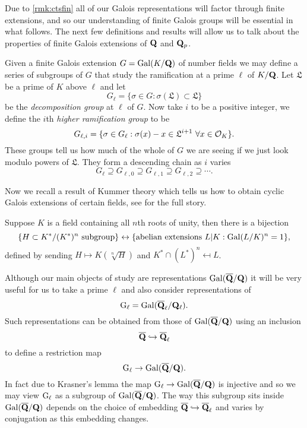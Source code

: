 \documentclass[a4paper,12pt]{article}
\begin{document}
Due to \cref{rmk:ctsfin} all of our Galois representations will factor through finite extensions, and so our understanding of finite Galois groups will be essential in what follows.
The next few definitions and results will allow us to talk about the properties of finite Galois extensions of $\mathbf{Q}$ and $\mathbf{Q}_p$.

\begin{defn}\label{def:higher}
Given a finite Galois extension $G = \operatorname{Gal}(K/\mathbf{Q})$ of number fields we may define a series of subgroups of $G$ that study the ramification at a prime $\ell$ of $K/\mathbf{Q}$.
Let $\mathfrak{L}$ be a prime of $K$ above $\ell$ and let
\[
G_\ell =\{\sigma \in G : \sigma(\mathfrak{L}) \subset \mathfrak{L}\}
\]
be the \emph{decomposition group} at $\ell$ of $G$.
Now take $i$ to be a positive integer, we define the $i$th \emph{higher ramification group} to be
\[
G_{\ell,i} = \{\sigma \in G_\ell : \sigma(x) - x \in \mathfrak{L}^{i + 1}\ \forall x \in \mathcal{O}_{K} \}.
\]
These groups tell us how much of the whole of $G$ we are seeing if we just look modulo powers of $\mathfrak{L}$.
They form a descending chain as $i$ varies
\[
G_\ell\supseteq G_{\ell,0} \supseteq G_{\ell,1} \supseteq G_{\ell, 2}\supseteq\cdots.
\]
\end{defn}

Now we recall a result of Kummer theory which tells us how to obtain cyclic Galois extensions of certain fields, see \cite{Birch} for the full story.

\begin{prop}\label{prop:kummer}
Suppose $K$ is a field containing all $n$th roots of unity, then there is a bijection
\[
\{H \subset K^*/(K^*)^n\text{ subgroup}\} \leftrightarrow \{\text{abelian extensions } L| K : \operatorname{Gal}(L/K)^n = 1\},
\]
defined by sending $H\mapsto K(\sqrt[n]{H})$ and $K^* \cap (L^*)^n\mapsfrom L$.
\end{prop}

Although our main objects of study are representations $\operatorname{Gal}(\overline{\mathbf{Q}}/\mathbf{Q})$ it will be very useful for us to take a prime $\ell$ and also consider representations of
\[
\mathrm{G}_\ell = \operatorname{Gal}(\overline{\mathbf{Q}}_\ell/\mathbf{Q}_\ell).
\]
Such representations can be obtained from those of $\operatorname{Gal}(\overline{\mathbf{Q}}/\mathbf{Q})$ using an inclusion
\[
\overline{\mathbf{Q}} \hookrightarrow \overline{\mathbf{Q}}_\ell
\]
to define a restriction map
\[
\mathrm{G}_\ell \to \operatorname{Gal}(\overline{\mathbf{Q}}/\mathbf{Q}).
\]
In fact due to Krasner's lemma \cite[p. 238]{Cohen} the map $\mathrm{G}_\ell \to \operatorname{Gal}(\overline{\mathbf{Q}}/\mathbf{Q})$ is injective and so we may view $\mathrm{G}_\ell$ as a subgroup of $\operatorname{Gal}(\overline{\mathbf{Q}}/\mathbf{Q})$.
The way this subgroup sits inside $\operatorname{Gal}(\overline{\mathbf{Q}}/\mathbf{Q})$ depends on the choice of embedding $\overline{\mathbf{Q}} \hookrightarrow \overline{\mathbf{Q}}_\ell$ and varies by conjugation as this embedding changes.
\end{document}
